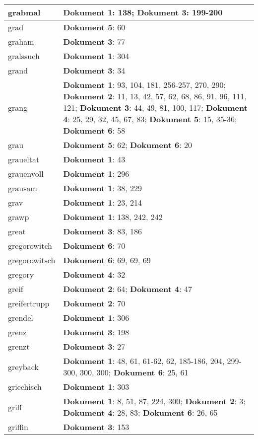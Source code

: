 \documentclass[a5paper]{article}
\begin{document}
\begin{longtable}[l]{|l|p{3in}|}
\hline
grabmal & \textbf{Dokument 1}: 138; \textbf{Dokument 3}: 199-200 \\
\hline
grad & \textbf{Dokument 5}: 60 \\
\hline
graham & \textbf{Dokument 3}: 77 \\
\hline
gralssuch & \textbf{Dokument 1}: 304 \\
\hline
grand & \textbf{Dokument 3}: 34 \\
\hline
grang & \textbf{Dokument 1}: 93, 104, 181, 256-257, 270, 290; \textbf{Dokument 2}: 11, 13, 42, 57, 62, 68, 86, 91, 96, 111, 121; \textbf{Dokument 3}: 44, 49, 81, 100, 117; \textbf{Dokument 4}: 25, 29, 32, 45, 67, 83; \textbf{Dokument 5}: 15, 35-36; \textbf{Dokument 6}: 58 \\
\hline
grau & \textbf{Dokument 5}: 62; \textbf{Dokument 6}: 20 \\
\hline
graueltat & \textbf{Dokument 1}: 43 \\
\hline
grauenvoll & \textbf{Dokument 1}: 296 \\
\hline
grausam & \textbf{Dokument 1}: 38, 229 \\
\hline
grav & \textbf{Dokument 1}: 23, 214 \\
\hline
grawp & \textbf{Dokument 1}: 138, 242, 242 \\
\hline
great & \textbf{Dokument 3}: 83, 186 \\
\hline
gregorowitch & \textbf{Dokument 6}: 70 \\
\hline
gregorowitsch & \textbf{Dokument 6}: 69, 69, 69 \\
\hline
gregory & \textbf{Dokument 4}: 32 \\
\hline
greif & \textbf{Dokument 2}: 64; \textbf{Dokument 4}: 47 \\
\hline
greifertrupp & \textbf{Dokument 2}: 70 \\
\hline
grendel & \textbf{Dokument 1}: 306 \\
\hline
grenz & \textbf{Dokument 3}: 198 \\
\hline
grenzt & \textbf{Dokument 3}: 27 \\
\hline
greyback & \textbf{Dokument 1}: 48, 61, 61-62, 62, 185-186, 204, 299-300, 300, 300; \textbf{Dokument 6}: 25, 61 \\
\hline
griechisch & \textbf{Dokument 1}: 303 \\
\hline
griff & \textbf{Dokument 1}: 8, 51, 87, 224, 300; \textbf{Dokument 2}: 3; \textbf{Dokument 4}: 28, 83; \textbf{Dokument 6}: 26, 65 \\
\hline
griffin & \textbf{Dokument 3}: 153 \\

\end{longtable}
\end{document}

